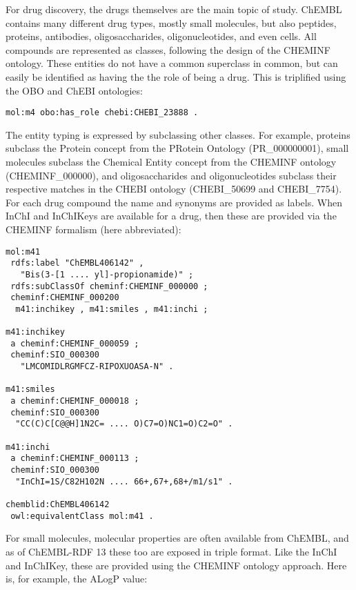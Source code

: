 \documentclass[sw]{iosart2c}
\begin{document}
For drug discovery, the drugs themselves are the main topic of study.
ChEMBL contains many different drug types, mostly small molecules,
but also peptides, proteins, antibodies, oligosaccharides, oligonucleotides, and
even cells. All compounds are represented as classes, following
the design of the CHEMINF ontology. These entities do not have a common
superclass in common, but can easily be identified as having the 
the role of being a drug. This is triplified using the OBO and ChEBI
ontologies:

\begin{footnotesize}
\begin{verbatim}
mol:m4 obo:has_role chebi:CHEBI_23888 .
\end{verbatim}
\end{footnotesize}

The entity typing is expressed
by subclassing other classes. For example, proteins subclass the
Protein concept from the PRotein Ontology (PR\_000000001), small
molecules subclass the Chemical Entity concept from the CHEMINF
ontology (CHEMINF\_000000), and oligosaccharides and oligonucleotides
subclass their respective matches in the CHEBI ontology (CHEBI\_50699
and CHEBI\_7754). For each drug compound the name and synonyms are
provided as labels. When InChI and InChIKeys are available for a drug, then these are
provided via the CHEMINF formalism (here abbreviated):

\begin{footnotesize}
\begin{verbatim}
mol:m41
 rdfs:label "ChEMBL406142" , 
   "Bis(3-[1 .... yl]-propionamide)" ;
 rdfs:subClassOf cheminf:CHEMINF_000000 ;
 cheminf:CHEMINF_000200
  m41:inchikey , m41:smiles , m41:inchi ;

m41:inchikey
 a cheminf:CHEMINF_000059 ;
 cheminf:SIO_000300
   "LMCOMIDLRGMFCZ-RIPOXUOASA-N" .

m41:smiles
 a cheminf:CHEMINF_000018 ;
 cheminf:SIO_000300
  "CC(C)C[C@@H]1N2C= .... O)C7=O)NC1=O)C2=O" .

m41:inchi
 a cheminf:CHEMINF_000113 ;
 cheminf:SIO_000300
  "InChI=1S/C82H102N .... 66+,67+,68+/m1/s1" .

chemblid:ChEMBL406142
 owl:equivalentClass mol:m41 .
\end{verbatim}
\end{footnotesize}

For small molecules, molecular properties are often available from ChEMBL, and as of ChEMBL-RDF 13
these too are exposed in triple format. Like the InChI and InChIKey, these are provided using the
CHEMINF ontology approach. Here is, for example, the ALogP value:
\end{document}
